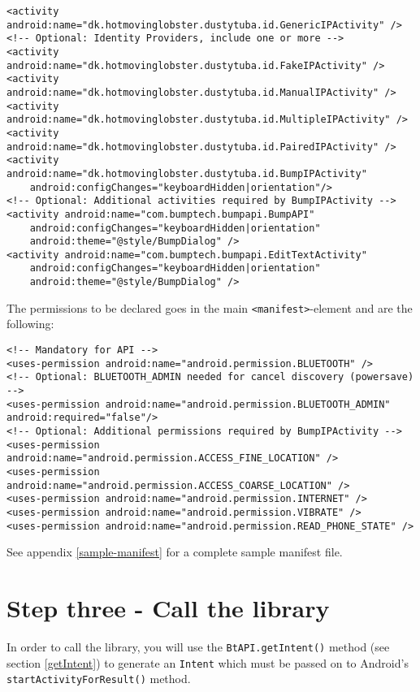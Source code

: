 \documentclass[a4paper,11pt]{article}
\begin{document}
\footnotesize
\begin{verbatim}
<activity android:name="dk.hotmovinglobster.dustytuba.id.GenericIPActivity" />
<!-- Optional: Identity Providers, include one or more -->
<activity android:name="dk.hotmovinglobster.dustytuba.id.FakeIPActivity" />
<activity android:name="dk.hotmovinglobster.dustytuba.id.ManualIPActivity" />
<activity android:name="dk.hotmovinglobster.dustytuba.id.MultipleIPActivity" />
<activity android:name="dk.hotmovinglobster.dustytuba.id.PairedIPActivity" />
<activity android:name="dk.hotmovinglobster.dustytuba.id.BumpIPActivity"
    android:configChanges="keyboardHidden|orientation"/>
<!-- Optional: Additional activities required by BumpIPActivity -->
<activity android:name="com.bumptech.bumpapi.BumpAPI"
    android:configChanges="keyboardHidden|orientation"
    android:theme="@style/BumpDialog" />
<activity android:name="com.bumptech.bumpapi.EditTextActivity"
    android:configChanges="keyboardHidden|orientation"
    android:theme="@style/BumpDialog" />
\end{verbatim}
\normalsize

The permissions to be declared goes in the main \verb+<manifest>+-element and are the following:

\footnotesize
\begin{verbatim}
<!-- Mandatory for API -->
<uses-permission android:name="android.permission.BLUETOOTH" />
<!-- Optional: BLUETOOTH_ADMIN needed for cancel discovery (powersave) -->
<uses-permission android:name="android.permission.BLUETOOTH_ADMIN" android:required="false"/>
<!-- Optional: Additional permissions required by BumpIPActivity -->
<uses-permission android:name="android.permission.ACCESS_FINE_LOCATION" />
<uses-permission android:name="android.permission.ACCESS_COARSE_LOCATION" />
<uses-permission android:name="android.permission.INTERNET" />
<uses-permission android:name="android.permission.VIBRATE" />
<uses-permission android:name="android.permission.READ_PHONE_STATE" />
\end{verbatim}
\normalsize

See appendix \ref{sample-manifest} for a complete sample manifest file.

\clearpage


\section{Step three - Call the library}
\label{stepthree}
In order to call the library, you will use the \verb+BtAPI.getIntent()+ method (see section \ref{getIntent}) to generate an \verb+Intent+ which must be passed on to Android's \verb+startActivityForResult()+ method.
\end{document}
